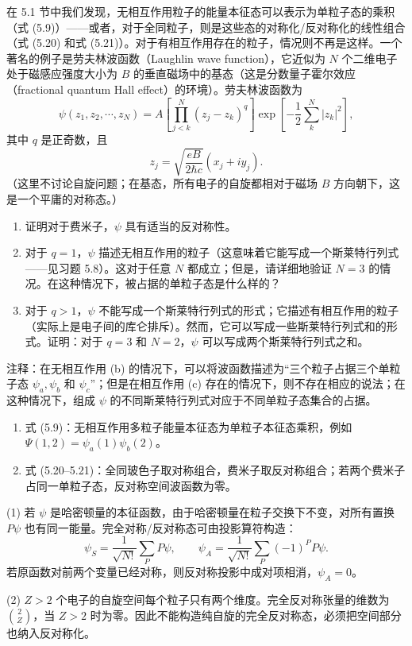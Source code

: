 \begin{question}
在 5.1 节中我们发现，无相互作用粒子的能量本征态可以表示为单粒子态的乘积（式 (5.9)）——或者，对于全同粒子，则是这些态的对称化/反对称化的线性组合（式 (5.20) 和式 (5.21)）。对于有相互作用存在的粒子，情况则不再是这样。一个著名的例子是劳夫林波函数（Laughlin wave function），它近似为 $N$ 个二维电子处于磁感应强度大小为 $B$ 的垂直磁场中的基态（这是分数量子霍尔效应（fractional quantum Hall effect）的环境）。劳夫林波函数为
\[
\psi(z_1,z_2,\cdots,z_N)=A\left[\prod_{j<k}^{N}(z_j-z_k)^q\right]\exp\left[-\frac12\sum_k^N |z_k|^2\right],
\]
其中 $q$ 是正奇数，且
\[
z_j=\sqrt{\frac{eB}{2\hbar c}}(x_j+i y_j).
\]
（这里不讨论自旋问题；在基态，所有电子的自旋都相对于磁场 $B$ 方向朝下，这是一个平庸的对称态。）
\begin{enumerate}
\item 证明对于费米子，$\psi$ 具有适当的反对称性。
\item 对于 $q=1$，$\psi$ 描述无相互作用的粒子（这意味着它能写成一个斯莱特行列式——见习题 5.8）。这对于任意 $N$ 都成立；但是，请详细地验证 $N=3$ 的情况。在这种情况下，被占据的单粒子态是什么样的？
\item 对于 $q>1$，$\psi$ 不能写成一个斯莱特行列式的形式；它描述有相互作用的粒子（实际上是电子间的库仑排斥）。然而，它可以写成一些斯莱特行列式和的形式。证明：对于 $q=3$ 和 $N=2$，$\psi$ 可以写成两个斯莱特行列式之和。
\end{enumerate}
注释：在无相互作用 (b) 的情况下，可以将波函数描述为“三个粒子占据三个单粒子态 $\psi_a,\psi_b$ 和 $\psi_c$”；但是在相互作用 (c) 存在的情况下，则不存在相应的说法；在这种情况下，组成 $\psi$ 的不同斯莱特行列式对应于不同单粒子态集合的占据。

\par\smallskip
{}
\begin{enumerate}[leftmargin=2.2em,itemsep=0.12em,topsep=0.12em,parsep=0pt]
\item 式 (5.9)：无相互作用多粒子能量本征态为单粒子本征态乘积，例如 $\Psi(1,2)=\psi_a(1)\psi_b(2)$。
\item 式 (5.20--5.21)：全同玻色子取对称组合，费米子取反对称组合；若两个费米子占同一单粒子态，反对称空间波函数为零。
\end{enumerate}

\end{question}
\begin{solution}

(1) 若 $\psi$ 是哈密顿量的本征函数，由于哈密顿量在粒子交换下不变，对所有置换 $P\psi$ 也有同一能量。完全对称/反对称态可由投影算符构造：
\[
\psi_S=\frac1{\sqrt{N!}}\sum_P P\psi,
\qquad
\psi_A=\frac1{\sqrt{N!}}\sum_P(-1)^P P\psi.
\]
若原函数对前两个变量已经对称，则反对称投影中成对项相消，$\psi_A=0$。

(2) $Z>2$ 个电子的自旋空间每个粒子只有两个维度。完全反对称张量的维数为 $\binom{2}{Z}$，当 $Z>2$ 时为零。因此不能构造纯自旋的完全反对称态，必须把空间部分也纳入反对称化。

\end{solution}

